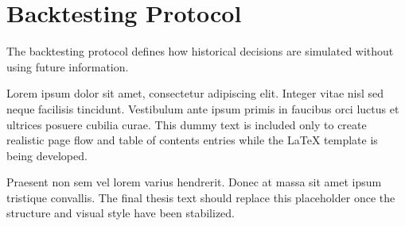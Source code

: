 \section{Backtesting Protocol}

The backtesting protocol defines how historical decisions are simulated without using future information.

Lorem ipsum dolor sit amet, consectetur adipiscing elit. Integer vitae nisl sed neque facilisis tincidunt. Vestibulum ante ipsum primis in faucibus orci luctus et ultrices posuere cubilia curae. This dummy text is included only to create realistic page flow and table of contents entries while the LaTeX template is being developed.

Praesent non sem vel lorem varius hendrerit. Donec at massa sit amet ipsum tristique convallis. The final thesis text should replace this placeholder once the structure and visual style have been stabilized.

